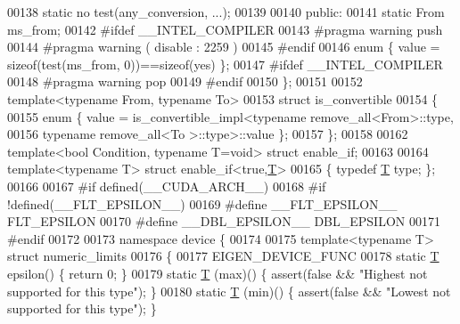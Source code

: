 \begin{DoxyCode}
00138   \textcolor{keyword}{static} no  test(any\_conversion, ...);
00139 
00140 \textcolor{keyword}{public}:
00141   \textcolor{keyword}{static} From ms\_from;
00142 \textcolor{preprocessor}{#ifdef \_\_INTEL\_COMPILER}
00143 \textcolor{preprocessor}{  #pragma warning push}
00144 \textcolor{preprocessor}{  #pragma warning ( disable : 2259 )}
00145 \textcolor{preprocessor}{#endif}
00146   \textcolor{keyword}{enum} \{ value = \textcolor{keyword}{sizeof}(test(ms\_from, 0))==\textcolor{keyword}{sizeof}(yes) \};
00147 \textcolor{preprocessor}{#ifdef \_\_INTEL\_COMPILER}
00148 \textcolor{preprocessor}{  #pragma warning pop}
00149 \textcolor{preprocessor}{#endif}
00150 \};
00151 
00152 \textcolor{keyword}{template}<\textcolor{keyword}{typename} From, \textcolor{keyword}{typename} To>
00153 \textcolor{keyword}{struct }is\_convertible
00154 \{
00155   \textcolor{keyword}{enum} \{ value = is\_convertible\_impl<typename remove\_all<From>::type,
00156                                      \textcolor{keyword}{typename} remove\_all<To  >::type>::value \};
00157 \};
00158 
00162 \textcolor{keyword}{template}<\textcolor{keywordtype}{bool} Condition, \textcolor{keyword}{typename} T=\textcolor{keywordtype}{void}> \textcolor{keyword}{struct }enable\_if;
00163 
00164 \textcolor{keyword}{template}<\textcolor{keyword}{typename} T> \textcolor{keyword}{struct }enable\_if<true,\hyperlink{group___sparse_core___module_class_eigen_1_1_triplet}{T}>
00165 \{ \textcolor{keyword}{typedef} \hyperlink{group___sparse_core___module_class_eigen_1_1_triplet}{T} type; \};
00166 
00167 \textcolor{preprocessor}{#if defined(\_\_CUDA\_ARCH\_\_)}
00168 \textcolor{preprocessor}{#if !defined(\_\_FLT\_EPSILON\_\_)}
00169 \textcolor{preprocessor}{#define \_\_FLT\_EPSILON\_\_ FLT\_EPSILON}
00170 \textcolor{preprocessor}{#define \_\_DBL\_EPSILON\_\_ DBL\_EPSILON}
00171 \textcolor{preprocessor}{#endif}
00172 
00173 \textcolor{keyword}{namespace }device \{
00174 
00175 \textcolor{keyword}{template}<\textcolor{keyword}{typename} T> \textcolor{keyword}{struct }numeric\_limits
00176 \{
00177   EIGEN\_DEVICE\_FUNC
00178   \textcolor{keyword}{static} \hyperlink{group___sparse_core___module_class_eigen_1_1_triplet}{T} epsilon() \{ \textcolor{keywordflow}{return} 0; \}
00179   \textcolor{keyword}{static} \hyperlink{group___sparse_core___module_class_eigen_1_1_triplet}{T} (max)() \{ assert(\textcolor{keyword}{false} && \textcolor{stringliteral}{"Highest not supported for this type"}); \}
00180   \textcolor{keyword}{static} \hyperlink{group___sparse_core___module_class_eigen_1_1_triplet}{T} (min)() \{ assert(\textcolor{keyword}{false} && \textcolor{stringliteral}{"Lowest not supported for this type"}); \}

\end{DoxyCode}

